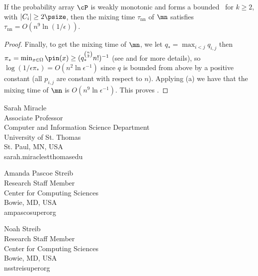 \documentclass{toc}
\begin{document}
\begin{theorem}\label{mnMixing} If the %
%
probability array $\cP$ is
weakly monotonic and
%
forms  %
a bounded \kP\, for $k\geq 2$, with $|C_i|\geq 2\psize$, 
then the mixing time $\tau_{\text{nn}}$ of $\mn$ satisfies 
$\tau_{\text{nn}} = O(n^{9}\ln(1/\epsilon))$.
\end{theorem}
\begin{proof}
Finally, to get the mixing time of $\mn$, we let $q_* =
\max_{i<j} q_{i,j}$ then $\pi_* =  \min_{x\in \Omega}\pin(x)
\geq (q_*^{\binom{n}{2}}n!)^{-1}$ (see \cite{bmrs} and \cite{MS} for
more details), so $\log(1/\epsilon \pi_*) = O(n^2\ln \epsilon^{-1})$
since $q$ is bounded from above by a positive constant (all $p_{i,j}$ are constant with respect to $n$).  Applying
(a) we have that the
mixing time of $\mn$ is $O(n^9\ln\epsilon^{-1})$.  This proves
.
\end{proof}


%
%
%
%


%
%
%
%
%
\begin{tocauthors}
\begin{tocinfo}[miracle]
 Sarah Miracle\\
 Associate Professor\\
 Computer and Information Science Department\\
 University of St. Thomas\\
 St. Paul, MN, USA\\
 sarah.miracle\tocat{}stthomas\tocdot{}edu \\ 
\end{tocinfo}
\begin{tocinfo}[streibA]
  Amanda Pascoe Streib\\
  Research Staff Member\\
  Center for Computing Sciences\\
  Bowie, MD, USA\\
  ampasco\tocat{}super\tocdot{}org \\
\end{tocinfo}
\begin{tocinfo}[streibN]
  Noah Streib\\
  Research Staff Member\\
  Center for Computing Sciences\\
  Bowie, MD, USA\\
  nsstrei\tocat{}super\tocdot{}org \\
\end{tocinfo}
\end{tocauthors}
\end{document}
